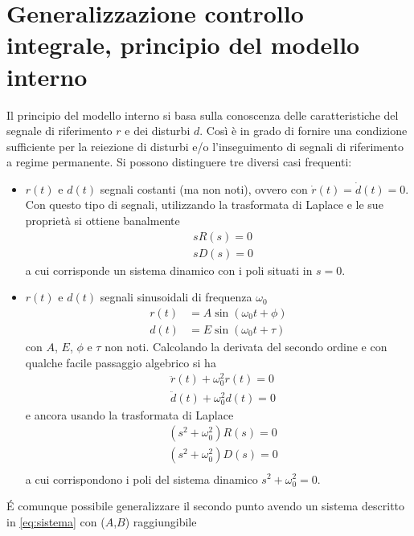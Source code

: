 \section{Generalizzazione controllo integrale, principio del modello interno}
\label{sec:modelloInterno}

	Il principio del modello interno si basa sulla conoscenza delle caratteristiche del segnale di riferimento $r$ e dei disturbi $d$. Così è in grado di fornire una condizione sufficiente per la reiezione di disturbi e/o l'inseguimento di segnali di riferimento a regime permanente. Si possono distinguere tre diversi casi frequenti:
	
	\begin{itemize}
		\item $r(t)$  e $d(t)$ segnali costanti (ma non noti), ovvero con $\dot{r}(t)=\dot{d}(t)=0$. Con questo tipo di segnali, utilizzando la trasformata di Laplace e le sue proprietà si ottiene banalmente
		\begin{align*}
			& sR(s)=0 \\
			& sD(s)=0
		\end{align*}
		a cui corrisponde un sistema dinamico con i poli situati in $s=0$.
		
		\item $r(t)$  e $d(t)$ segnali sinusoidali di frequenza $\omega_0$
		\begin{align*}
			r(t) &= A\sin(\omega_0t+\phi) \\
			d(t) &= E\sin(\omega_0t+\tau) 
		\end{align*}
		con $A$, $E$, $\phi$ e $\tau$ non noti. Calcolando la derivata del secondo ordine e con qualche facile passaggio algebrico si ha
		\begin{align*}
			& \ddot{r}(t) + \omega_0^2r(t)=0 \\
			& \ddot{d}(t) + \omega_0^2d(t)=0 
		\end{align*}
		e ancora usando la trasformata di Laplace 
		\begin{align*}
			& (s^2+\omega_0^2)R(s)=0 \\
			& (s^2+\omega_0^2)D(s)=0 \\
		\end{align*}
		a cui corrispondono i poli del sistema dinamico $s^2+\omega_0^2=0$.
		
	\end{itemize}	
	
	\noindent É comunque possibile generalizzare il secondo punto avendo un sistema descritto in \ref{eq:sistema} con ($A$,$B$) raggiungibile
	
